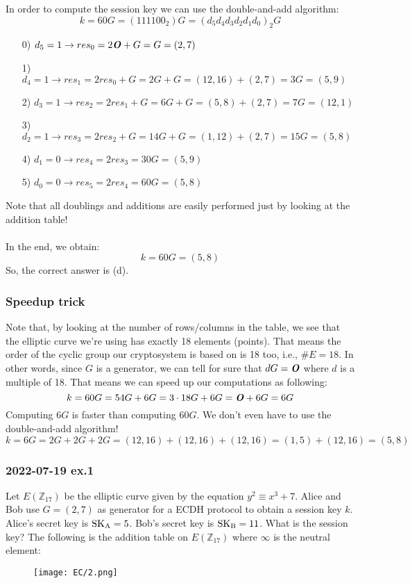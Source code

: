 \newpage
\hfill\break
In order to compute the session key we can use the double-and-add algorithm:
$$k=60G=(111100_2)G=(d_5d_4d_3d_2d_1d_0)_2G$$
\begin{enumerate}
    \item[0)] $d_5=1\rightarrow res_0=2\text{\textbf{\textit{O}}}+G=G=(2,7)$
    \item[1)] $d_4=1\rightarrow res_1=2res_0+G=2G+G=(12,16)+(2,7)=3G=(5,9)$
    \item[2)] $d_3=1\rightarrow res_2=2res_1+G=6G+G=(5,8)+(2,7)=7G=(12,1)$
    \item[3)] $d_2=1\rightarrow res_3=2res_2+G=14G+G=(1,12)+(2,7)=15G=(5,8)$
    \item[4)] $d_1=0\rightarrow res_4=2res_3=30G=(5,9)$
    \item[5)] $d_0=0\rightarrow res_5=2res_4=60G=(5,8)$
\end{enumerate}
Note that all doublings and additions are easily performed just by looking at the addition table!\\\\
In the end, we obtain: $$k=60G=(5,8)$$
So, the correct answer is (d).

\subsubsection*{Speedup trick}
Note that, by looking at the number of rows/columns in the table, we see that the elliptic curve we're using has exactly 18 elements (points). That means the order of the cyclic group our cryptosystem is based on is 18 too, i.e., $\#E=18$. In other words, since $G$ is a generator, we can tell for sure that $dG=\text{\textbf{\textit{O}}}$ where $d$ is a multiple of 18. That means we can speed up our computations as following:
$$k=60G=54G+6G=3\cdot18G+6G=\text{\textbf{\textit{O}}}+6G=6G$$
Computing $6G$ is faster than computing $60G$. We don't even have to use the double-and-add algorithm!
$$k=6G=2G+2G+2G=(12,16)+(12,16)+(12,16)=(1,5)+(12,16)=(5,8)$$

\newpage
\subsubsection{2022-07-19 ex.1}
Let $E(\mathbb{Z}_{17})$ be the elliptic curve given by the equation $y^2\equiv x^3+7$. Alice and Bob use $G=(2,7)$ as generator for a ECDH protocol to obtain a session key $k$. Alice's secret key is $\text{SK}_{\text A}=5$. Bob's secret key is $\text{SK}_{\text B}=11$. What is the session key?
The following is the addition table on $E(\mathbb{Z}_{17})$ where $\infty$ is the neutral element:
\begin{figure}[H]
    \centering
    \texttt{[image: EC/2.png]}
\end{figure}

